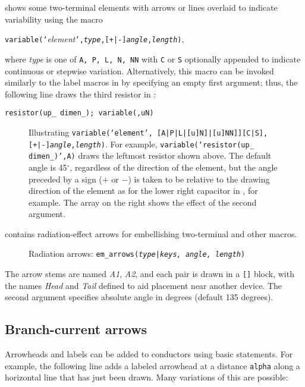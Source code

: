 \enlargethispage{\baselineskip}
 shows some two-terminal elements with
arrows or lines overlaid to indicate variability using the macro
\par
{\tt variable(`}{\sl element}{\tt',{\sl type},[+|-]{\sl angle},{\sl length})},

\noindent
where {\sl type} is one of {\tt A, P, L, N, NN} with {\tt C} or {\tt S}
optionally appended to indicate continuous or stepwise variation.
Alternatively, this macro
can be invoked similarly to the label macros in
 by specifying an empty first argument;
thus, the following line draws the third resistor in :
\par
   {\tt resistor(up\_ dimen\_); variable(,uN)}

\begin{figure}[H]
\vspace*{-\baselineskip}
   
   \caption{Illustrating
{\tt variable(`{\sl element}',%
[A|P|L|[u]N]|[u]NN]][C|S],[+|-]{\sl angle},{\sl length})}.
   For example, {\tt variable(`resistor(up\_ dimen\_)',A)} draws
   the leftmost resistor shown above.
   The default angle is 45${}^{\circ}$, regardless of the direction of
   the element, but the angle preceded by a sign ($+$ or $-$) is taken
   to be relative to the drawing direction of the element as for the
   lower right capacitor in , for example.  The array on
   the right shows the effect of the second argument.}
   \label{Variable}
   \end{figure}

 contains radiation-effect arrows for embellishing two-terminal
and other macros.
\begin{figure}[H]
   
   \caption{Radiation arrows: {\tt em\_arrows({\sl type}|{\sl keys,%
     angle, length})}}
   \label{Emarrows}
   \end{figure}
The arrow stems are named {\sl A1}, {\sl A2},
and each pair is drawn in a \verb|[]| block, with
the names {\sl Head} and {\sl Tail} defined to
aid placement near another device.  The second argument specifies
absolute angle in degrees (default 135 degrees).

\subsection{Branch-current arrows\label{Branchcurrent:}}
Arrowheads and labels can be added to conductors using basic
\pic statements.  For example, the following line adds a labeled
arrowhead at a distance {\tt alpha} along a horizontal line that has
just been drawn.  Many variations of this are possible:

